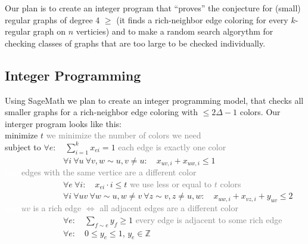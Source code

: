 \documentclass[12pt,a4paper]{amsart}
\theoremstyle{definition} %
\theoremstyle{plain} %
\newcommand{\Z}{\mathbb Z}
\begin{document}
Our plan is to create an integer program that ``proves'' the conjecture for (small) regular graphs of degree 4 $\geq$ (it finds a rich-neighbor edge coloring for every $k$-regular graph on $n$ verticies) and to make a random search algorythm for checking classes of graphs that are too large to be checked individually.

\subsection{Integer Programming}

Using SageMath we plan to create an integer programming model, that checks all smaller graphs for a rich-neighbor edge coloring with $\leq 2 \Delta - 1$ colors. Our interger program looks like this:\\

minimize $t$ \hfill \textcolor{gray}{we minimize the number of colors we need}\\

subject to $\forall e: \quad \sum_{i=1}^{k} x_{ei} = 1$ \hfill \textcolor{gray}{each edge is exactly one color}\\

\ \ \ \ \ \ \ \ \ \ \ \ \ \ $\forall i \ \forall u \ \forall v, w \sim u, v \neq u: \quad x_{uv, i} + x_{uw, i} \leq 1$\\[0.1mm]
\textcolor{white}{hihi} \hfill \textcolor{gray}{edges with the same vertice are a different color}\\

\ \ \ \ \ \ \ \ \ \ \ \ \ \ $\forall e \ \forall i: \quad x_{ei} \cdot i \leq t$ \hfill \textcolor{gray}{we use less or equal to $t$ colors}\\

\ \ \ \ \ \ \ \ \ \ \ \ \ \ $\forall i \ \forall uv \ \forall w \sim u, w \neq v \ \forall z \sim v, z \neq u, w: \quad x_{uw, i} + x_{vz, i} + y_{uv} \leq 2$ \hfill \\[0.1mm]
\textcolor{white}{hihi} \hfill \textcolor{gray}{$uv$ is a rich edge $\Leftrightarrow$ all adjacent edges are a different color}\\

\ \ \ \ \ \ \ \ \ \ \ \ \ \ $\forall e: \quad \sum_{f \sim e}y_f \geq 1$ \hfill \textcolor{gray}{every edge is adjacent to some rich edge}\\

\ \ \ \ \ \ \ \ \ \ \ \ \ \ $\forall e: \quad 0 \leq y_{e} \leq 1$, $y_{e} \in \Z$\\
\end{document}

